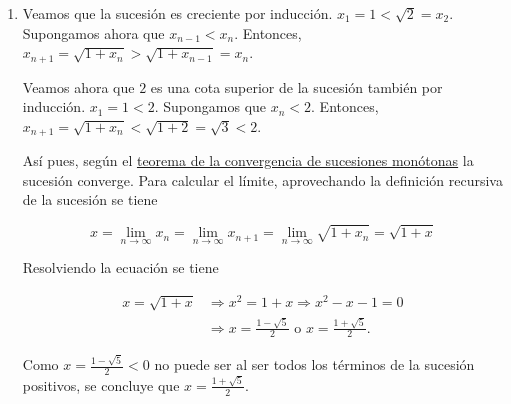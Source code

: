 \documentclass[
  spanish,
  a4paper,
]{scrreport}
\theoremstyle{definition}
\theoremstyle{remark}
\begin{document}
\begin{tcolorbox}
\begin{enumerate}
  Como \(y=\frac{1-\sqrt{5}}{2}<0\) no puede ser al ser todos los
  términos de la sucesión positivos, se tiene que
  \(y=\frac{1+\sqrt{5}}{2}\).

  Del mismo modo se puede probar que la subsucesión de los términos
  pares \((z_n)_{n=1}^\infty = (x_{2n})_{n=1}^\infty\) también converge
  a \(\frac{1+\sqrt{5}}{2}\).

  Finalmente, se deja como ejercicio probar que si las subsucesiones de
  los términos pares e impares de una sucesión convergen al mismo
  límite, entonces la sucesión converge al mismo límite.
\item
  Veamos que la sucesión es creciente por inducción.
  \(x_1=1<\sqrt{2}=x_2\). Supongamos ahora que \(x_{n-1}<x_n\).
  Entonces, \(x_{n+1} = \sqrt{1+x_n} > \sqrt{1+x_{n-1}} = x_n\).

  Veamos ahora que \(2\) es una cota superior de la sucesión también por
  inducción. \(x_1 = 1 < 2\). Supongamos que \(x_n<2\). Entonces,
  \(x_{n+1}=\sqrt{1+x_n} < \sqrt{1+2} = \sqrt{3} < 2\).

  Así pues, según el
  \href{https://aprendeconalf.es/analisis-manual/sucesiones.html\#thm-convergencia-monotona}{teorema
  de la convergencia de sucesiones monótonas} la sucesión converge. Para
  calcular el límite, aprovechando la definición recursiva de la
  sucesión se tiene

  \[
   x = \lim_{n\to\infty}x_n = \lim_{n\to\infty}x_{n+1} = \lim_{n\to\infty}\sqrt{1+x_n} = \sqrt{1+x}
   \]

  Resolviendo la ecuación se tiene

  \begin{align*}
   x=\sqrt{1+x} &\Rightarrow x^2=1+x \Rightarrow x^2-x-1=0 \\ 
   &\Rightarrow x=\frac{1-\sqrt{5}}{2} \mbox{ o } x=\frac{1+\sqrt{5}}{2}.
   \end{align*}

  Como \(x=\frac{1-\sqrt{5}}{2}<0\) no puede ser al ser todos los
  términos de la sucesión positivos, se concluye que
  \(x=\frac{1+\sqrt{5}}{2}\).
\end{enumerate}

\end{tcolorbox}
\end{document}
